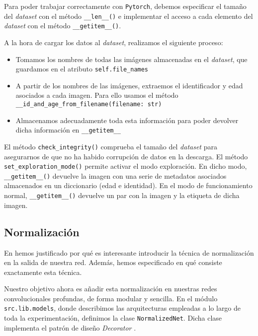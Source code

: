 Para poder trabajar correctamente con \lstinline{Pytorch}, debemos especificar el tamaño del \textit{dataset} con el método \lstinline{__len__()} e implementar el acceso a cada elemento del \textit{dataset} con el método \lstinline{__getitem__()}.

A la hora de cargar los datos al \textit{dataset}, realizamos el siguiente proceso:

\begin{itemize}
    \item Tomamos los nombres de todas las imágenes almacenadas en el \textit{dataset}, que guardamos en el atributo \lstinline{self.file_names}
    \item A partir de los nombres de las imágenes, extraemos el identificador y edad asociados a cada imagen. Para ello usamos el método \lstinline{__id_and_age_from_filename(filename: str)}
    \item Almacenamos adecuadamente toda esta información para poder devolver dicha información en \lstinline{__getitem__}
\end{itemize}

El método \lstinline{check_integrity()} comprueba el tamaño del \textit{dataset} para asegurarnos de que no ha habido corrupción de datos en la descarga. El método \lstinline{set_exploration_mode()} permite activar el modo exploración. En dicho modo, \lstinline{__getitem__()} devuelve la imagen con una serie de metadatos asociados almacenados en un diccionario (edad e identidad). En el modo de funcionamiento normal, \lstinline{__getitem__()} devuelve un par con la imagen y la etiqueta de dicha imagen.

\subsection{Normalización} \label{isubs:normalization_impl}

En  hemos justificado por qué es interesante introducir la técnica de normalización en la salida de nuestra red. Además, hemos especificado en qué consiste exactamente esta técnica.

Nuestro objetivo ahora es añadir esta normalización en nuestras redes convolucionales profundas, de forma modular y sencilla. En el módulo \lstinline{src.lib.models}, donde describimos las arquitecturas empleadas a lo largo de toda la experimentación, definimos la clase \lstinline{NormalizedNet}. Dicha clase implementa el patrón de diseño \textit{Decorator} \cite{informatica:design_patterns} \cite{informatica:decorator_pattern}.

